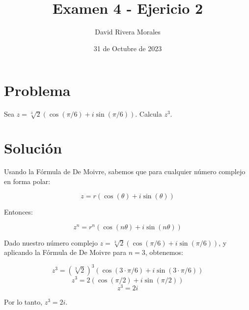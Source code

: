 \documentclass[12pt]{article}
\title{Examen 4 - Ejericio 2}
\author{David Rivera Morales}
\date{31 de Octubre de 2023}
\begin{document}
\maketitle

\section*{Problema}
Sea \( z = \sqrt[3]{2}(\cos(\pi/6) + i\sin(\pi/6)) \). Calcula \( z^3 \).

\section*{Solución}
Usando la Fórmula de De Moivre, sabemos que para cualquier número complejo en forma polar:

\[ z = r (\cos(\theta) + i \sin(\theta)) \]

Entonces:

\[ z^n = r^n (\cos(n\theta) + i \sin(n\theta)) \]

Dado nuestro número complejo \( z = \sqrt[3]{2}(\cos(\pi/6) + i\sin(\pi/6)) \), y aplicando la Fórmula de De Moivre para \( n = 3 \), obtenemos:

\[ z^3 = (\sqrt[3]{2})^3 (\cos(3\cdot\pi/6) + i \sin(3\cdot\pi/6)) \]
\[ z^3 = 2 (\cos(\pi/2) + i \sin(\pi/2)) \]
\[ z^3 = 2i \]

Por lo tanto, \( z^3 = 2i \).
\end{document}
